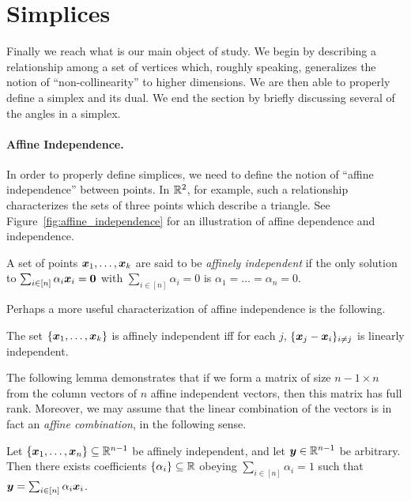 \section{Simplices}
\label{sec:background_simplices}

Finally we reach what is our main object of study. We begin by describing a  relationship  among a set  of vertices which,  roughly speaking,  generalizes the notion of ``non-collinearity'' to  higher dimensions. We are then able to properly define a simplex and its dual. We end the section by briefly discussing several  of the angles in a simplex. 

\paragraph{Affine Independence.}
In order to properly define simplices, we need to define the  notion of ``affine independence'' between  points.  In $\mathbb{R}^2$, for example, such a relationship characterizes the sets of three points which describe a triangle. See Figure~\ref{fig:affine_independence} for an  illustration of affine dependence and independence.  


\begin{definition}
	\label{def:affine_independence}
A set of points $\vb*{x}_1,\dots,\vb*{x}_k$ are said to be \emph{affinely independent} if the only solution to $\sum_{i\in[n]}\alpha_i\vb*{x}_i=\vb{0}$ with $\sum_{i\in [n]}\alpha_i=0$ is $\alpha_1=\dots=\alpha_n=0$. 
\end{definition}

Perhaps a more useful characterization of affine independence is the following. 

\begin{lemma}
	\label{lem:affine-linearly-independent}
	The set $\{\vb*{x}_1,\dots,\vb*{x}_k\}$ is affinely independent iff for each $j$, $\{\vb*{x}_j-\vb*{x}_i\}_{i\neq j}$ is linearly independent. 
\end{lemma}

The following lemma demonstrates that if we form a matrix of size $n-1\times n$ from the column vectors of $n$  affine independent vectors, then this matrix has full rank. Moreover, we may assume that the linear combination of the vectors is in fact an \emph{affine combination}, in the  following sense. 

\begin{lemma}
	\label{lem:barycentric_coeffs}
	Let $\{\vb*{x}_1,\dots,\vb*{x}_n\}\subseteq\mathbb{R}^{n-1}$ be affinely independent, and let  $\vb*{y}\in\mathbb{R}^{n-1}$ be arbitrary. Then there exists coefficients $\{\alpha_i\}\subseteq\mathbb{R}$ obeying $\sum_{i\in[n]}\alpha_i=1$ such that $\vb*{y}=\sum_{i\in[n]}\alpha_i\vb*{x}_i$. 
\end{lemma}

